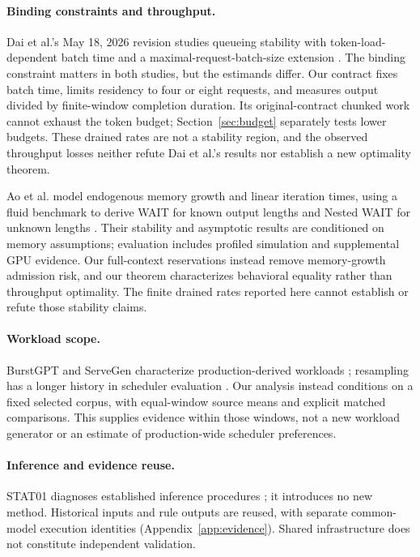 \paragraph{Binding constraints and throughput.}
Dai et al.'s May 18, 2026 revision studies queueing stability with token-load-
dependent batch time and a maximal-request-batch-size extension
\citep{dai2026throughput}. The binding constraint matters in both studies,
but the estimands differ. Our contract fixes batch time, limits residency to four or
eight requests, and measures output divided by finite-window completion
duration. Its original-contract chunked work cannot exhaust the token budget;
Section~\ref{sec:budget} separately tests lower budgets. These drained
rates are not a stability region, and the observed throughput losses neither
refute Dai et al.'s results nor establish a new optimality theorem.

Ao et al. model endogenous memory growth and linear iteration times,
using a fluid benchmark to derive WAIT for known output lengths and Nested
WAIT for unknown lengths \citep{ao2026fluid}. Their stability and asymptotic
results are conditioned on memory assumptions; evaluation includes profiled
simulation and supplemental GPU evidence. Our full-context reservations
instead remove memory-growth admission risk, and our theorem characterizes
behavioral equality rather than throughput optimality. The finite drained
rates reported here cannot establish or refute those stability claims.

\paragraph{Workload scope.}
BurstGPT and ServeGen characterize production-derived workloads
\citep{burstgpt2025,servegen2026}; resampling has a longer history in scheduler
evaluation \citep{zakay2014resampling}. Our analysis instead conditions on a fixed
selected corpus, with equal-window source means and explicit matched
comparisons. This supplies evidence within those windows, not a new workload
generator or an estimate of production-wide scheduler preferences.

\paragraph{Inference and evidence reuse.}
STAT01 diagnoses established inference procedures
\citep{benjamini1995,benjamini2001dependency,holm1979,hoeffding1963};
it introduces no new method. Historical inputs and rule outputs are reused,
with separate common-model execution identities (Appendix~\ref{app:evidence}).
Shared infrastructure does not constitute independent validation.

